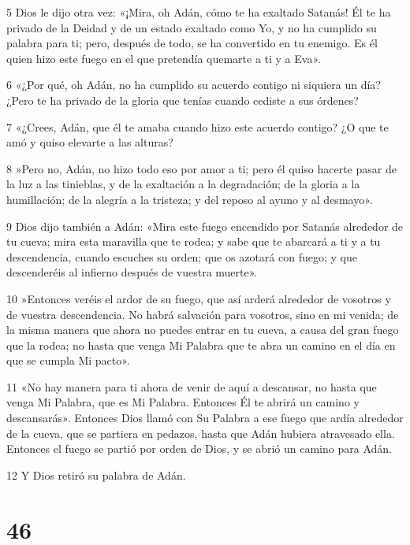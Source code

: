 \par 5 Dios le dijo otra vez: «¡Mira, oh Adán, cómo te ha exaltado Satanás! Él te ha privado de la Deidad y de un estado exaltado como Yo, y no ha cumplido su palabra para ti; pero, después de todo, se ha convertido en tu enemigo. Es él quien hizo este fuego en el que pretendía quemarte a ti y a Eva».

\par 6 «¿Por qué, oh Adán, no ha cumplido su acuerdo contigo ni siquiera un día? ¿Pero te ha privado de la gloria que tenías cuando cediste a sus órdenes?

\par 7 «¿Crees, Adán, que él te amaba cuando hizo este acuerdo contigo? ¿O que te amó y quiso elevarte a las alturas?

\par 8 »Pero no, Adán, no hizo todo eso por amor a ti; pero él quiso hacerte pasar de la luz a las tinieblas, y de la exaltación a la degradación; de la gloria a la humillación; de la alegría a la tristeza; y del reposo al ayuno y al desmayo».

\par 9 Dios dijo también a Adán: «Mira este fuego encendido por Satanás alrededor de tu cueva; mira esta maravilla que te rodea; y sabe que te abarcará a ti y a tu descendencia, cuando escuches su orden; que os azotará con fuego; y que descenderéis al infierno después de vuestra muerte».

\par 10 »Entonces veréis el ardor de su fuego, que así arderá alrededor de vosotros y de vuestra descendencia. No habrá salvación para vosotros, sino en mi venida; de la misma manera que ahora no puedes entrar en tu cueva, a causa del gran fuego que la rodea; no hasta que venga Mi Palabra que te abra un camino en el día en que se cumpla Mi pacto».

\par 11 «No hay manera para ti ahora de venir de aquí a descansar, no hasta que venga Mi Palabra, que es Mi Palabra. Entonces Él te abrirá un camino y descansarás». Entonces Dios llamó con Su Palabra a ese fuego que ardía alrededor de la cueva, que se partiera en pedazos, hasta que Adán hubiera atravesado ella. Entonces el fuego se partió por orden de Dios, y se abrió un camino para Adán.

\par 12 Y Dios retiró su palabra de Adán.

\chapter{46}

